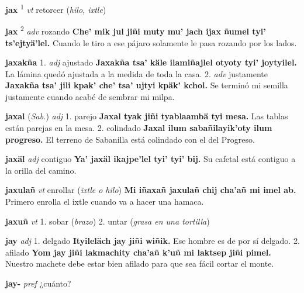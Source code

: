 \documentclass[10pt]{scrbook}
\newcommand{\entry}[1]{\textbf{#1}}
\newcommand{\onedefinition}[1]{#1.}
\newcommand{\defsuperscript}[1]{\textsuperscript{#1}}
\newcommand{\partofspeech}[1]{\textit{#1}}
\newcommand{\spanishtranslation}[1]{#1}
\newcommand{\clarification}[1]{(\textit{#1})}
\newcommand{\cholexample}[1]{\textbf{#1}}
\newcommand{\exampletranslation}[1]{#1}
\newcommand{\relevantdialect}[1]{(\textit{#1})}
\begin{document}
\begin{multicols}{2}
\entry{jax}
\defsuperscript{1}
\partofspeech{vt}
\spanishtranslation{retorcer}
\clarification{hilo, ixtle}

\entry{jax}
\defsuperscript{2}
\partofspeech{adv}
\spanishtranslation{rozando}
\cholexample{Che' mik jul jiñi muty mu' jach ijax ñumel tyi' ts'ejtyä'lel.}
\exampletranslation{Cuando le tiro a ese pájaro solamente le pasa rozando por los lados.}

\entry{jaxakña}
\onedefinition{1}
\partofspeech{adj}
\spanishtranslation{ajustado}
\cholexample{Jaxakña tsa' käle ilamiñajlel otyoty tyi' joytyilel.}
\exampletranslation{La lámina quedó ajustada a la medida de toda la casa.}
\onedefinition{2}
\partofspeech{adv}
\spanishtranslation{justamente}
\cholexample{Jaxakña tsa' jili kpak' che' tsa' ujtyi kpäk' kchol.}
\exampletranslation{Se terminó mi semilla justamente cuando acabé de sembrar mi milpa.}

\entry{jaxal}
\relevantdialect{Sab.}
\partofspeech{adj}
\onedefinition{1}
\spanishtranslation{parejo}
\cholexample{Jaxal tyak jiñi tyablaambä tyi mesa.}
\exampletranslation{Las tablas están parejas en la mesa.}
\onedefinition{2}
\spanishtranslation{colindado}
\cholexample{Jaxal ilum sabañilayik'oty ilum progreso.}
\exampletranslation{El terreno de Sabanilla está colindado con el del Progreso.}

\entry{jaxäl}
\partofspeech{adj}
\spanishtranslation{contiguo}
\cholexample{Ya' jaxäl ikajpe'lel tyi' tyi' bij.}
\exampletranslation{Su cafetal está contiguo a la orilla del camino.}

\entry{jaxulañ}
\partofspeech{vt}
\spanishtranslation{enrollar}
\clarification{ixtle o hilo}
\cholexample{Mi iñaxañ jaxulañ chij cha'añ mi imel ab.}
\exampletranslation{Primero enrolla el ixtle cuando va a hacer una hamaca.}

\entry{jaxuñ}
\partofspeech{vt}
\onedefinition{1}
\spanishtranslation{sobar}
\clarification{brazo}
\onedefinition{2}
\spanishtranslation{untar}
\clarification{grasa en una tortilla}

\entry{jay}
\partofspeech{adj}
\onedefinition{1}
\spanishtranslation{delgado}
\cholexample{Ityileläch jay jiñi wiñik.}
\exampletranslation{Ese hombre es de por sí delgado.}
\onedefinition{2}
\spanishtranslation{afilado}
\cholexample{Yom jay jiñi lakmachity cha'añ k'uñ mi laktsep jiñi pimel.}
\exampletranslation{Nuestro machete debe estar bien afilado para que sea fácil cortar el monte.}

\entry{jay-}
\partofspeech{pref}
\spanishtranslation{¿cuánto?}


\end{multicols}
\end{document}
